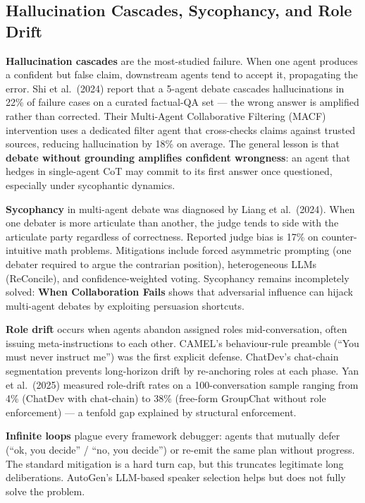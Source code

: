 \documentclass{article}
\begin{document}
\subsection{Hallucination Cascades, Sycophancy, and Role Drift}\label{hallucination-cascades-sycophancy-and-role-drift}

\textbf{Hallucination cascades} are the most-studied failure. When one agent produces a confident but false claim, downstream agents tend to accept it, propagating the error. Shi et al.~(2024) report that a 5-agent debate cascades hallucinations in 22\% of failure cases on a curated factual-QA set --- the wrong answer is amplified rather than corrected. Their Multi-Agent Collaborative Filtering (MACF) intervention uses a dedicated filter agent that cross-checks claims against trusted sources, reducing hallucination by 18\% on average. The general lesson is that \textbf{debate without grounding amplifies confident wrongness}: an agent that hedges in single-agent CoT may commit to its first answer once questioned, especially under sycophantic dynamics.

\textbf{Sycophancy} in multi-agent debate was diagnosed by Liang et al.~(2024). When one debater is more articulate than another, the judge tends to side with the articulate party regardless of correctness. Reported judge bias is 17\% on counter-intuitive math problems. Mitigations include forced asymmetric prompting (one debater required to argue the contrarian position), heterogeneous LLMs (ReConcile), and confidence-weighted voting. Sycophancy remains incompletely solved: \textbf{When Collaboration Fails} \citep{kraidia20262026} shows that adversarial influence can hijack multi-agent debates by exploiting persuasion shortcuts.

\textbf{Role drift} occurs when agents abandon assigned roles mid-conversation, often issuing meta-instructions to each other. CAMEL's behaviour-rule preamble (``You must never instruct me'') was the first explicit defense. ChatDev's chat-chain segmentation prevents long-horizon drift by re-anchoring roles at each phase. Yan et al.~(2025) measured role-drift rates on a 100-conversation sample ranging from 4\% (ChatDev with chat-chain) to 38\% (free-form GroupChat without role enforcement) --- a tenfold gap explained by structural enforcement.

\textbf{Infinite loops} plague every framework debugger: agents that mutually defer (``ok, you decide'' / ``no, you decide'') or re-emit the same plan without progress. The standard mitigation is a hard turn cap, but this truncates legitimate long deliberations. AutoGen's LLM-based speaker selection helps but does not fully solve the problem.
\end{document}
